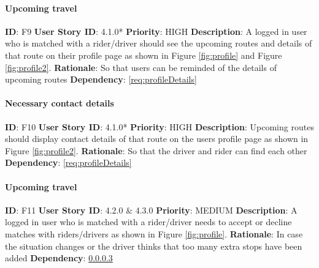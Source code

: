 \documentclass{article}
\begin{document}
\paragraph{Upcoming travel}\label{req:upcomingTravel}
\textbf{ID}: F9\newline
\textbf{User Story ID}: 4.1.0*\newline
\textbf{Priority}: HIGH\newline
\textbf{Description}: A logged in user who is matched with a rider/driver should see the upcoming routes and details of that route on their profile page as shown in Figure \ref{fig:profile} and Figure \ref{fig:profile2}. \newline
\textbf{Rationale}: So that users can be reminded of the details of upcoming routes\newline
\textbf{Dependency}: \ref{req:profileDetails}\newline

\paragraph{Necessary contact details}\label{req:contactDetails}
\textbf{ID}: F10\newline
\textbf{User Story ID}: 4.1.0*\newline
\textbf{Priority}: HIGH\newline
\textbf{Description}: Upcoming routes should display contact details of that route on the users profile page as shown in Figure \ref{fig:profile2}. \newline
\textbf{Rationale}: So that the driver and rider can find each other\newline
\textbf{Dependency}: \ref{req:profileDetails}\newline

\paragraph{Upcoming travel}\label{req:upcomingTravel}
\textbf{ID}: F11\newline
\textbf{User Story ID}: 4.2.0 \& 4.3.0\newline
\textbf{Priority}: MEDIUM\newline
\textbf{Description}: A logged in user who is matched with a rider/driver needs to accept or decline matches with riders/drivers as shown in Figure \ref{fig:profile}. \newline
\textbf{Rationale}: In case the situation changes or the driver thinks that too many extra stops have been added\newline
\textbf{Dependency}: \ref{req:upcomingTravel}\newline
\end{document}
